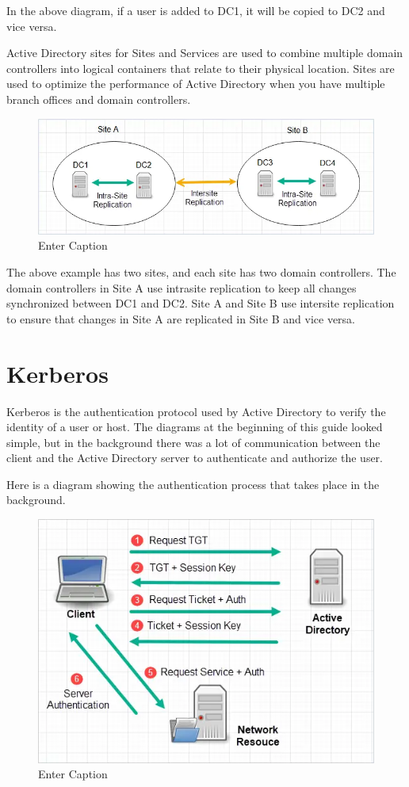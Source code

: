 In the above diagram, if a user is added to DC1, it will be copied to DC2 and vice versa.

Active Directory sites for Sites and Services are used to combine multiple domain controllers into logical containers that relate to their physical location. Sites are used to optimize the performance of Active Directory when you have multiple branch offices and domain controllers.

\begin{figure}
    \centering
    \includegraphics[width=0.75\linewidth]{intersiterepl.png}
    \caption{Enter Caption}
    \label{fig:placeholder}
\end{figure}

The above example has two sites, and each site has two domain controllers. The domain controllers in Site A use intrasite replication to keep all changes synchronized between DC1 and DC2. Site A and Site B use intersite replication to ensure that changes in Site A are replicated in Site B and vice versa.

\section{Kerberos}
Kerberos is the authentication protocol used by Active Directory to verify the identity of a user or host. The diagrams at the beginning of this guide looked simple, but in the background there was a lot of communication between the client and the Active Directory server to authenticate and authorize the user.

Here is a diagram showing the authentication process that takes place in the background.

\begin{figure}
    \centering
    \includegraphics[width=0.75\linewidth]{kerbauth.png}
    \caption{Enter Caption}
    \label{fig:placeholder}
\end{figure}

